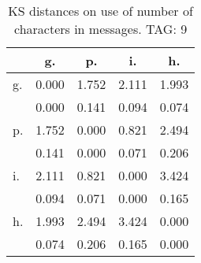 \begin{table}[h!]
\begin{center}
\begin{tabular}{| l | c | c | c | c |}\hline
 & g. & p. & i. & h. \\\hline
g. & 0.000  & 1.752  & 2.111  & 1.993 \\\hline
 & 0.000  & 0.141  & 0.094  & 0.074 \\\hline
p. & 1.752  & 0.000  & 0.821  & 2.494 \\\hline
 & 0.141  & 0.000  & 0.071  & 0.206 \\\hline
i. & 2.111  & 0.821  & 0.000  & 3.424 \\\hline
 & 0.094  & 0.071  & 0.000  & 0.165 \\\hline
h. & 1.993  & 2.494  & 3.424  & 0.000 \\\hline
 & 0.074  & 0.206  & 0.165  & 0.000 \\\hline
\end{tabular}
\caption{KS distances on use of number of characters in messages. TAG: 9}
\end{center}
\end{table}